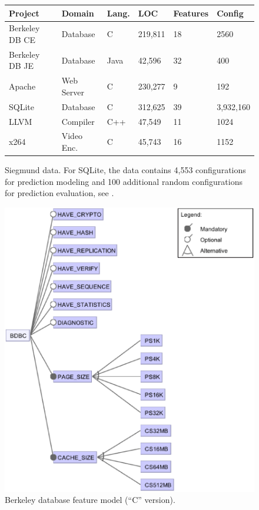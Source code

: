 \documentclass{sig-alternate}
\begin{document}
 
 \begin{figure}[!t]
\scriptsize
\begin{tabular}{llllll}
  \hline
  \rowcolor{lightgray}
Project & Domain & Lang. & LOC & Features & Config\\\hline
Berkeley DB CE & Database & C & 219,811 & 18 & 2560\\
Berkeley DB JE & Database & Java & 42,596 & 32  & 400\\
Apache & Web Server & C & 230,277 & 9 & 192\\
SQLite & Database & C & 312,625 & 39 & 3,932,160\\
LLVM & Compiler & C++ & 47,549 & 11 & 1024\\
x264 & Video Enc. & C& 45,743 & 16 & 1152\\\hline
\end{tabular}
 
\caption{Siegmund data.
For SQLite, the data  contains 4,553 configurations for prediction modeling and 100 additional random configurations for prediction evaluation, see \cite{vapp}.}\label{fig:cpm}
\end{figure}

\begin{figure}[!t]
\includegraphics[width=1\linewidth]{_figs/BDBC.eps}
\caption{ Berkeley database feature model   (``C'' version). }\label{fig:bdbc}
\end{figure}
\end{document}
